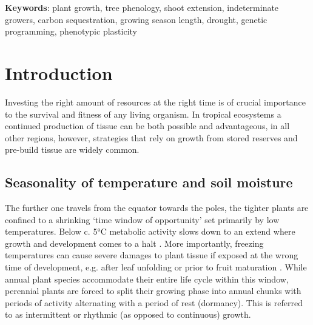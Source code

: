 \documentclass{article}
\begin{document}
			\textbf{Keywords}: plant growth, tree phenology, shoot extension, indeterminate growers, carbon sequestration, growing season length, drought, genetic programming, phenotypic plasticity
			\newpage
			
\section*{Introduction}
	

		Investing the right amount of resources at the right time is of crucial importance to the survival and fitness of any living organism. In tropical ecosystems a continued production of tissue can be both possible and advantageous, in all other regions, however, strategies that rely on growth from stored reserves and pre-build tissue are widely common. %

	\subsection*{Seasonality of temperature and soil moisture}
		The further one travels from the equator towards the poles, the tighter plants are confined to a shrinking ‘time window of opportunity’ set primarily by low temperatures. Below c. 5°C  metabolic activity slows down to an extend where growth and development comes to a halt \citep{schenkerPhysiologicalMinimumTemperatures2014, rossiCriticalTemperaturesXylogenesis2008, kornerWinterCropGrowth2008}. More importantly, freezing temperatures can cause severe damages to plant tissue if exposed at the wrong time of development, e.g. after leaf unfolding or prior to fruit maturation \citep{sakaiFreezingInjuriesPlants1987c, baumgartenNoRiskNo2023a}. %
		While annual plant species accommodate their entire life cycle within this window, perennial plants are forced to split their growing phase into annual chunks with periods of activity alternating with a period of rest (dormancy). This is referred to as intermittent or rhythmic (as opposed to continuous) growth. \\
\end{document}
